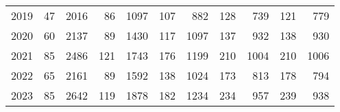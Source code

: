 \documentclass{article}
\begin{document}
\begin{table}[!ht]
\begin{tabular}{l | rr| rr| rr| rr| rr}
        2019 & 47 & 2016 & 86 & 1097 & 107 & 882 & 128 & 739 & 121 & 779 \\ 
        2020 & 60 & 2137 & 89 & 1430 & 117 & 1097 & 137 & 932 & 138 & 930 \\ 
        2021 & 85 & 2486 & 121 & 1743 & 176 & 1199 & 210 & 1004 & 210 & 1006 \\ 
        2022 & 65 & 2161 & 89 & 1592 & 138 & 1024 & 173 & 813 & 178 & 794 \\ 
        2023 & 85 & 2642 & 119 & 1878 & 182 & 1234 & 234 & 957 & 239 & 938 \\ \hline
    \end{tabular}
    \label{tab_comparison_wl}
\end{table}
\end{document}
